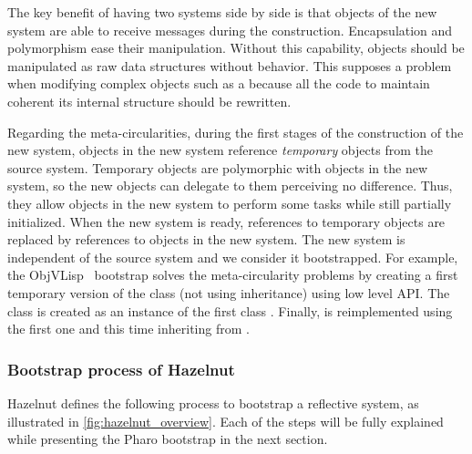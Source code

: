 The key benefit of having two systems side by side is that objects of the new system are able to receive messages during the construction.
Encapsulation and polymorphism ease their manipulation.
Without this capability, objects should be manipulated as raw data structures without behavior. This supposes a problem when modifying complex objects such as a  because all the code to maintain coherent its internal structure should be rewritten.

Regarding the meta-circularities, during the first stages of the construction of the new system, objects in the new system reference \emph{temporary} objects from the source system.
Temporary objects are polymorphic with objects in the new system, so the new objects can delegate to them perceiving no difference.
Thus, they allow objects in the new system to perform some tasks while still partially initialized.
When the new system is ready, references to temporary objects are replaced by references to objects in the new system.
The new system is independent of the source system and we consider it bootstrapped. For example, the ObjVLisp~\cite{Coin87a} bootstrap solves the meta-circularity problems by creating a first temporary version of the class  (not using inheritance) using low level API.
The class  is created as an instance of the first class . Finally,  is reimplemented using the first one and this time inheriting from .

\subsubsection{Bootstrap process of Hazelnut}
Hazelnut defines the following process to bootstrap a reflective system, as illustrated in \autoref{fig:hazelnut_overview}. Each of the steps will be fully explained while presenting the Pharo bootstrap in the next section. 

